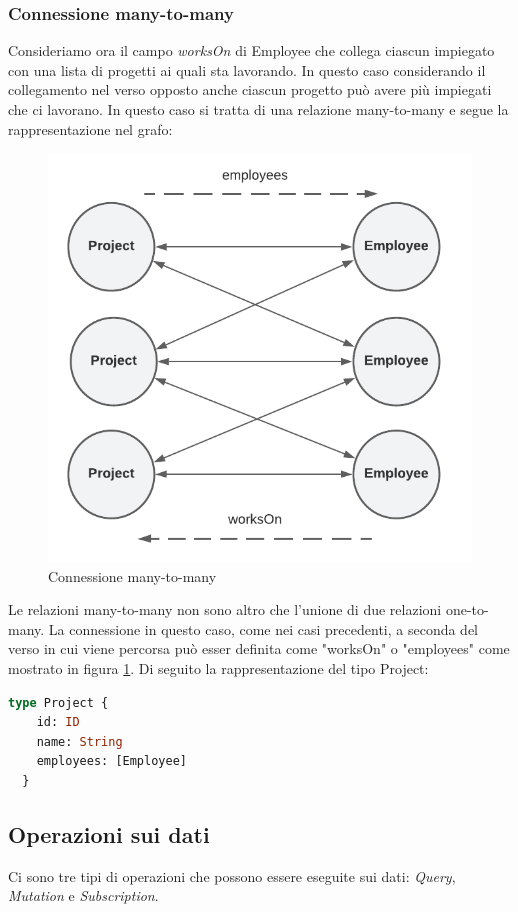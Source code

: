 \subsubsection*{Connessione many-to-many}
Consideriamo ora il campo \textit{worksOn} di Employee che collega ciascun impiegato con una lista di progetti ai quali sta lavorando. In questo caso considerando il collegamento nel verso opposto anche ciascun progetto può avere più impiegati che ci lavorano. In questo caso si tratta di una relazione many-to-many e segue la rappresentazione nel grafo:
\begin{figure}[!h]
\centering
\includegraphics[width=0.4\linewidth]{immagini/many_to_many.pdf}
\caption{Connessione many-to-many}
\label{many-to-many}
\end{figure}
Le relazioni many-to-many non sono altro che l'unione di due relazioni one-to-many.
La connessione in questo caso, come nei casi precedenti, a seconda del verso in cui viene percorsa può esser definita come "worksOn" o "employees" come mostrato in figura \ref{many-to-many}. Di seguito la rappresentazione del tipo Project:
\begin{lstlisting}[language=GraphQL,]
  type Project {
    id: ID
    name: String
    employees: [Employee]
  }
\end{lstlisting}
\subsection*{Operazioni sui dati}
Ci sono tre tipi di operazioni che possono essere eseguite sui dati: \textit{Query}, \textit{Mutation} e \textit{Subscription}.

